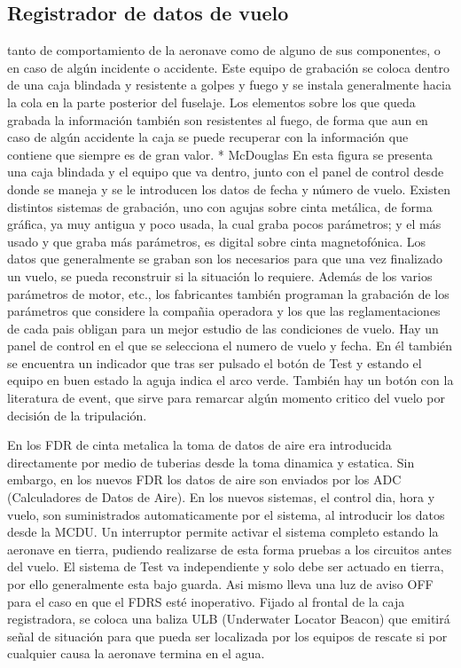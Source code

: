 
\subsection{Registrador de datos de vuelo}
\label{sec:registrador.datos.vuelo}

tanto de comportamiento de la aeronave como de alguno de sus componentes, o en caso de algún incidente o accidente. Este equipo de grabación se coloca dentro de una caja blindada y resistente a golpes y fuego y se instala generalmente hacia la cola en la parte posterior del fuselaje. Los elementos sobre los que queda grabada la información también son resistentes al fuego, de forma que aun en caso de algún accidente la caja se puede recuperar con la información que contiene que siempre es de gran valor. * McDouglas   En esta ﬁgura se presenta una caja blindada y el equipo que va dentro, junto con el panel de control desde donde se maneja y se le introducen los datos de fecha y número de vuelo. Existen distintos sistemas de grabación, uno con agujas sobre cinta metálica, de forma gráﬁca, ya muy antigua y poco usada, la cual graba pocos parámetros; y el más usado y que graba más parámetros, es digital sobre cinta magnetofónica. Los datos que generalmente se graban son los necesarios para que una vez ﬁnalizado un vuelo, se pueda reconstruir si la situación lo requiere. Además de los 
varios parámetros de motor, etc., los fabricantes también programan la grabación de los parámetros que considere la compañia operadora y los que las reglamentaciones de cada pais obligan para un mejor estudio de las condiciones de vuelo. Hay un panel de control en el que se selecciona el numero de vuelo y fecha. En él también se encuentra un indicador que tras ser pulsado el botón de Test y estando el equipo en buen estado la aguja indica el arco verde. También hay un botón con la literatura de event, que sirve para remarcar algún momento critico del vuelo por decisión de la tripulación.

En los FDR de cinta metalica la toma de datos de aire era introducida directamente por medio de tuberias desde la toma dinamica y estatica. Sin embargo, en los nuevos FDR los datos de aire son enviados por los ADC (Calculadores de Datos de Aire). En los nuevos sistemas, el control dia, hora y vuelo, son suministrados automaticamente por el sistema, al introducir los datos desde la MCDU. Un interruptor permite activar el sistema completo estando la aeronave en tierra, pudiendo realizarse de esta forma pruebas a los circuitos antes del vuelo. El sistema de Test va independiente y solo debe ser actuado en tierra, por ello generalmente esta bajo guarda. Asi mismo lleva una luz de aviso OFF para el caso en que el FDRS esté inoperativo. Fijado al frontal de la caja registradora, se coloca una baliza ULB (Underwater Locator Beacon) que emitirá señal de situación para que pueda ser localizada por los equipos de rescate si por cualquier causa la aeronave termina en el agua.




